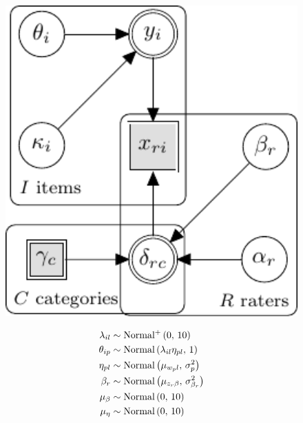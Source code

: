 \documentclass[a4paper,usenames,dvipsnames]{article}
\begin{document}
\begin{figure}[!ht]
	\begin{minipage}{0.6\textwidth}
		\centering
		\includegraphics[width=1\textwidth, page=10]{graphicalModels/graphicalModels.pdf}
	\end{minipage}\hfill
\begin{minipage}{0.4\textwidth}
{\large
	\begin{align*}
	\lambda_{il}		&\sim 	\text{Normal\textsuperscript{+}}\left(0,\,10\right)																	\\
	\theta_{ip} 			&\sim 	\text{Normal}\left(\lambda_{il}\eta_{pl},\,1\right)						\\
	\eta_{pl} 		&\sim 	\text{Normal}\left(\mu_{w_{p}l},\,\sigma_{p}^2\right)		\\
	\beta_r   					&\sim 	\text{Normal}\left(\mu_{z_r\beta},\,\sigma_{\beta_r}^2\right)\\
	\mu_{\beta}						&\sim 	\text{Normal}\left(0,\,10\right)																	\\
	\mu_{\eta}						&\sim 	\text{Normal}\left(0,\,10\right)
	\end{align*}
}%
\end{minipage}

\end{figure}
\end{document}
